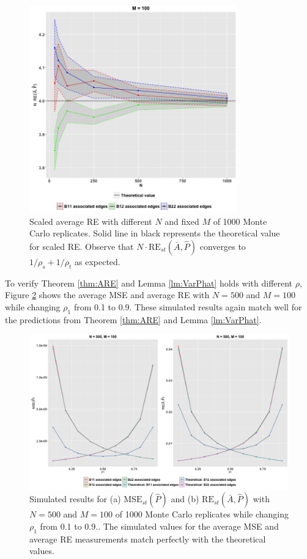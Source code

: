 \begin{figure}[!htb]
	\centering
	\includegraphics[width=9cm]{RE.png}
	\caption{Scaled average RE with different $N$ and fixed $M$ of 1000 Monte Carlo replicates. Solid line in black represents the theoretical value for scaled RE. Observe that $N \cdot \mathrm{RE}_{st}(\bar{A}, \hat{P})$ converges to $1/\rho_s + 1/\rho_t$ as expected.}
	\label{fig:RE}
\end{figure}




To verify Theorem \ref{thm:ARE} and Lemma \ref{lm:VarPhat} holds with different $\rho$, Figure \ref{fig:RErho} shows the average MSE and average RE with $N = 500$ and $M = 100$ while changing $\rho_1$ from 0.1 to 0.9. These simulated results again match well for the predictions from Theorem \ref{thm:ARE} and Lemma \ref{lm:VarPhat}.
\begin{figure}[!htb]
\centering
\includegraphics[width=14cm]{Rho.png}
\caption{Simulated results for (a) $\mathrm{MSE}_{st}(\hat{P})$ and (b) $\mathrm{RE}_{st}(\bar{A}, \hat{P})$ with $N = 500$ and $M = 100$ of 1000 Monte Carlo replicates while changing $\rho_1$ from 0.1 to 0.9.. The simulated values for the average MSE and average RE measurements match perfectly with the theoretical values.}
\label{fig:RErho}
\end{figure}





